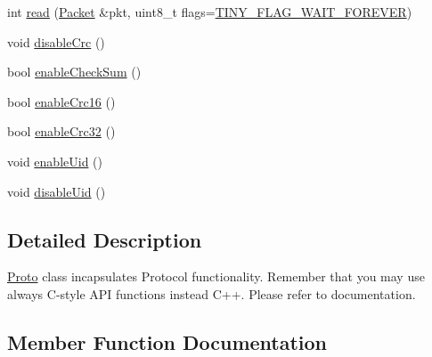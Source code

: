 \begin{DoxyCompactItemize}
\item 
int \hyperlink{classTiny_1_1Proto_aedef629f8b8968db7c8693bb45039651}{read} (\hyperlink{classTiny_1_1Packet}{Packet} \&pkt, uint8\+\_\+t flags=\hyperlink{group__FLAGS__GROUP_ga3a34267804581c5709d03f52d232b307}{T\+I\+N\+Y\+\_\+\+F\+L\+A\+G\+\_\+\+W\+A\+I\+T\+\_\+\+F\+O\+R\+E\+V\+E\+R})
\item 
void \hyperlink{classTiny_1_1Proto_a8992983d7ada115b0aa24db41594947c}{disable\+Crc} ()
\item 
bool \hyperlink{classTiny_1_1Proto_abb6cbae9a9944dc9ae0d756554f65a52}{enable\+Check\+Sum} ()
\item 
bool \hyperlink{classTiny_1_1Proto_a794afcac2ca15544247c34b059bc1289}{enable\+Crc16} ()
\item 
bool \hyperlink{classTiny_1_1Proto_a2ef1c80490d9343b896180ab8b8a6f77}{enable\+Crc32} ()
\item 
void \hyperlink{classTiny_1_1Proto_a9fdd64b8296e27f3205cd0d3ea685eac}{enable\+Uid} ()
\item 
void \hyperlink{classTiny_1_1Proto_aff9f3c59f58a8ca527ad0254ab806c5c}{disable\+Uid} ()
\end{DoxyCompactItemize}


\subsection{Detailed Description}
\hyperlink{classTiny_1_1Proto}{Proto} class incapsulates Protocol functionality. Remember that you may use always C-\/style A\+P\+I functions instead C++. Please refer to documentation. 

\subsection{Member Function Documentation}
\hypertarget{classTiny_1_1Proto_a6f5f4ebec42dc6e679c25e79284d7705}{}
